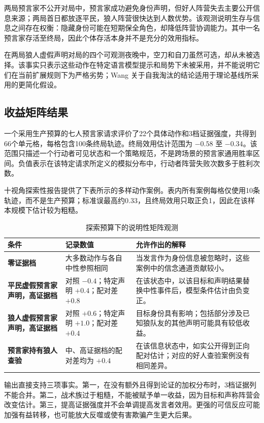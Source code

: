 \documentclass[UTF8,11pt,a4paper,fontset=windows]{ctexart}
\begin{document}
两局预言家不公开对局中，预言家成功避免身份声明，但好人阵营失去主要公开信息来源；两局首日都放逐平民，狼人阵营很快达到人数优势。该观测说明生存与信息之间存在权衡：隐藏身份可能在短期保全角色，却降低阵营协调能力。其中一名预言家存活至终局，因此个体存活本身并不是充分的效用指标。

在两局狼人虚假声明对局的四个可观测夜晚中，空刀和自刀虽然可选，却从未被选择。该事实只表示这些动作在特定语言模型提示和局势下未被采用，并不能说明它们在当前扩展规则下为严格劣势；Wang 关于自我淘汰的结论适用于理论基线所采用的更简化假设。

\subsection{收益矩阵结果}

一个采用生产预算的七人预言家请求评价了22个具体动作和3档证据强度，共得到66个单元格，每格包含100条终局轨迹。终局效用估计范围为 $-0.58$ 至 $-0.34$。该范围只描述一个行动者可见状态和一个策略规范，不是跨场景的预言家通用胜率区间。负值表示在该特定请求所定义的模拟分布中，行动者阵营失败次数多于胜利次数。

十视角探索性报告提供了下表所示的多样动作案例。表内所有案例每格仅使用10条轨迹，而不是生产预算；标准误最高约0.33，且终局效用只取正负1，因此在该样本规模下估计较为粗糙。

\begin{table}[htbp]
\centering
\caption{探索预算下的说明性矩阵观测}
\begin{tabularx}{\textwidth}{>{\bfseries}p{}p{}Y}
\toprule
条件 & 记录数值 & 允许作出的解释 \\
\midrule
零证据档 & 大多数动作与各自中性参照相同 & 当发言作为身份信息被忽略时，这些案例中的信念通道贡献较小。 \\
平民虚假预言家声明，高证据档 & 对照 $-0.4$；特定声明 $+0.4$；配对差 $+0.8$ & 在该状态中，以该目标和声明结果替换中性事件后，模型条件估计由负变正。 \\
狼人虚假预言家声明，高证据档 & 对照 $+0.6$；特定声明 $+1.0$；配对差 $+0.4$ & 目标身份具有影响；包括部分涉及已知狼队友的其他声明可能具有较低收益。 \\
预言家持有狼人查验 & 中、高证据档的配对差均为 $+0.4$ & 在该信息状态中，如实公开得到正向配对估计；对应的好人查验案例没有相同差异。 \\
\bottomrule
\end{tabularx}
\end{table}

输出直接支持三项事实。第一，在没有额外且得到论证的加权分布时，3档证据列不能合并。第二，战术族过于粗糙，不能被赋予单一收益，因为目标和声称阵营会改变估计。第三，提高证据强度并不会单调提高发言者效用。更强的可信反应可能加强有益转移，也可能放大反噬或使有害欺骗产生更大后果。
\end{document}
